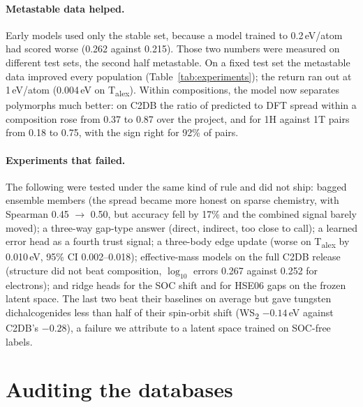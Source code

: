 \documentclass[11pt]{article}
\begin{document}
\paragraph{Metastable data helped.} Early models used only the stable set, because a
model trained to 0.2\,eV/atom had scored worse (0.262 against 0.215). Those two numbers
were measured on different test sets, the second half metastable. On a fixed test set
the metastable data improved every population (Table~\ref{tab:experiments}); the return
ran out at 1\,eV/atom (0.004\,eV on T\textsubscript{alex}). Within compositions, the
model now separates polymorphs much better: on C2DB the ratio of predicted to DFT
spread within a composition rose from 0.37 to 0.87 over the project, and for 1H
against 1T pairs from 0.18 to 0.75, with the sign right for 92\% of pairs.

\paragraph{Experiments that failed.} The following were tested under the same kind of
rule and did not ship: bagged ensemble members (the spread became more honest on sparse
chemistry, with Spearman 0.45 $\to$ 0.50, but accuracy fell by 17\% and the combined
signal barely moved); a three-way gap-type answer (direct, indirect, too close to call);
a learned error head as a fourth trust signal; a three-body edge update (worse on
T\textsubscript{alex} by 0.010\,eV, 95\% CI 0.002--0.018); effective-mass models on the
full C2DB release (structure did not beat composition, $\log_{10}$ errors 0.267 against
0.252 for electrons); and ridge heads for the SOC shift and for HSE06 gaps on the
frozen latent space. The last two beat their baselines on average but gave tungsten
dichalcogenides less than half of their spin-orbit shift (WS\textsubscript{2}
$-0.14$\,eV against C2DB's $-0.28$), a failure we attribute to a latent space trained
on SOC-free labels.

\section{Auditing the databases}\label{sec:audit}
\end{document}
